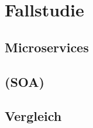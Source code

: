 \chapter{Fallstudie}
\label{chap:fallstudie}

\section{Microservices}

\section{\SOA (SOA)}

\section{Vergleich}

